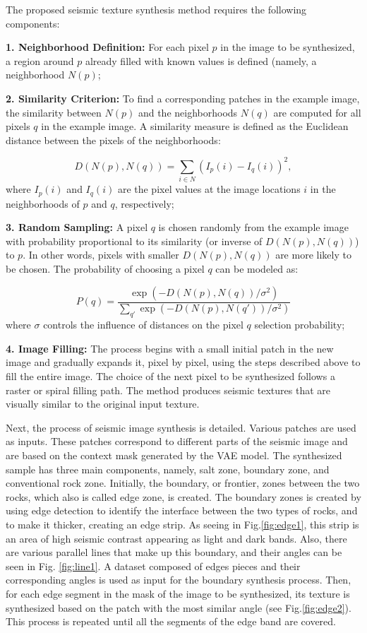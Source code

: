 \documentclass{ieeeaccess}
\begin{document}
The proposed seismic texture synthesis method requires the following components:

\textbf{1. Neighborhood Definition:} For each pixel $p$ in the image to be synthesized, a region around $p$ already filled with known values is defined (namely, a neighborhood $N(p)$;

\textbf{2. Similarity Criterion:} To find a corresponding patches in the example image, the similarity between $N(p)$ and the neighborhoods $N(q)$ are computed for all pixels $q$ in the example image. A similarity measure is defined as the Euclidean distance between the pixels of the neighborhoods:

\begin{equation}
D(N(p), N(q)) = \sum_{i \in N} \left( I_p(i) - I_q(i) \right)^2,
\end{equation}
where $I_p(i)$ and $I_q(i)$ are the pixel values at the image locations $i$ in the neighborhoods of $p$ and $q$, respectively;

\textbf{3. Random Sampling:} A pixel $q$ is chosen randomly from the example image with probability proportional to its similarity (or inverse of $D(N(p), N(q))$) to $p$. In other words, pixels with smaller $D(N(p), N(q))$ are more likely to be chosen. The probability of choosing a pixel $q$ can be modeled as:

\begin{equation}
P(q) = \frac{\exp(-D(N(p), N(q)) / \sigma^2)}{\sum_{q'} \exp(-D(N(p), N(q')) / \sigma^2)}
\end{equation}
where $\sigma$ controls the influence of distances on the pixel $q$ selection probability;

\textbf{4. Image Filling:} The process begins with a small initial patch in the new image and gradually expands it, pixel by pixel, using the steps described above to fill the entire image. The choice of the next pixel to be synthesized follows a raster or spiral filling path. The method produces seismic textures that are visually similar to the original input texture. 

Next, the process of seismic image synthesis is detailed. Various patches are used as inputs. These patches correspond to different parts of the seismic image and are based on the context mask generated by the VAE model. The synthesized sample has three main components, namely, salt zone, boundary zone, and conventional rock zone. Initially, the boundary, or frontier, zones between the two rocks, which also is called edge zone, is  created. The boundary zones is created by using edge detection to identify the interface between the two types of rocks, and to make it thicker, creating an edge strip. As seeing in Fig.\ref{fig:edge1}, this strip is an area of high seismic contrast appearing as light and dark bands. Also, there are various parallel lines that make up this boundary, and their angles can be seen in Fig. \ref{fig:line1}. A dataset composed of edges pieces and their corresponding angles is used as input for the boundary synthesis process. Then, for each edge segment in the mask of the image to be synthesized, its texture is synthesized based on the patch with the most similar angle (see Fig.\ref{fig:edge2}). This process is repeated until all the segments of the edge band are covered.
\end{document}

